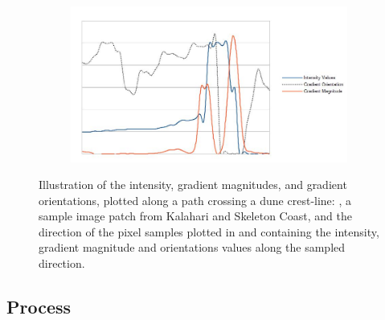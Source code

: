 \begin{figure}[htbp]
\begin{subfigure}[b]{0.15\textwidth}
		\caption{}
		\label{fig:skeletoncoast_patch_arrow}
	\end{subfigure}
	\begin{subfigure}[b]{0.65\textwidth}
		\centering
		\includegraphics[width=\linewidth]{figures/skeletoncoast_patch_plot}
		\caption{}
		\label{fig:skeletoncoast_patch_plot}
	\end{subfigure}
	
	\caption{Illustration of the intensity, gradient magnitudes, and gradient orientations, plotted along a path crossing a dune crest-line: ,  a sample image patch from Kalahari and Skeleton Coast,  and  the direction of the pixel samples plotted in  and  containing the intensity, gradient magnitude and orientations values along the sampled direction. }
	\label{fig:patches}
\end{figure}

\subsection{Process}

